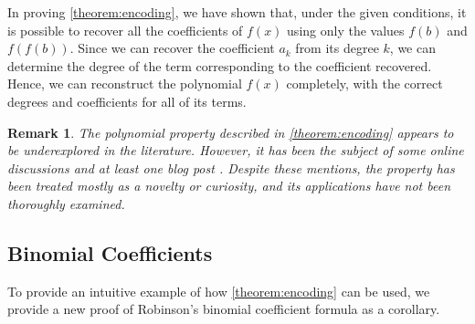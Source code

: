 \documentclass[10pt,a4paper]{article}
\theoremstyle{plain}
\newtheorem{remark}{Remark}[section]
\begin{document}
In proving \cref{theorem:encoding}, we have shown that, under the given conditions, it is possible to recover all the coefficients of $f(x)$ using only the values $f(b)$ and $f(f(b))$. Since we can recover the coefficient $a_k$ from its degree $k$, we can determine the degree of the term corresponding to the coefficient recovered. Hence, we can reconstruct the polynomial $f(x)$ completely, with the correct degrees and coefficients for all of its terms.

\begin{remark}
The polynomial property described in \cref{theorem:encoding} appears to be underexplored in the literature. However, it has been the subject of some online discussions \cite{mathoverflow2012application, reddit2023determine} and at least one blog post \cite{jcook2012polynomial}. Despite these mentions, the property has been treated mostly as a novelty or curiosity, and its applications have not been thoroughly examined.
\end{remark}

\subsection{Binomial Coefficients}
To provide an intuitive example of how \cref{theorem:encoding} can be used, we provide a new proof of Robinson's binomial coefficient formula \cite{robinson1952arithmetic} as a corollary.
\end{document}

